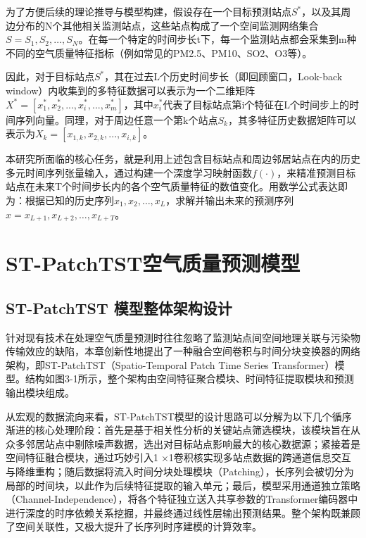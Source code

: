 为了方便后续的理论推导与模型构建，假设存在一个目标预测站点$S^*$，以及其周边分布的N个其他相关监测站点，这些站点构成了一个空间监测网络集合$S={S_1,S_2,\dots,S_N}$。在每一个特定的时间步长t下，每一个监测站点都会采集到m种不同的空气质量特征指标（例如常见的PM2.5、PM10、SO2、O3等）。

因此，对于目标站点$S^*$，其在过去L个历史时间步长（即回顾窗口，Look-back window）内收集到的多特征数据可以表示为一个二维矩阵$X^* = [x_1^*, x_2^*, ..., x_i^*, ..., x_m^*]$，其中$x_i^*$代表了目标站点第i个特征在L个时间步上的时间序列向量。同理，对于周边任意一个第k个站点$S_k$，其多特征历史数据矩阵可以表示为$X_k = [x_{1,k}, x_{2,k}, ..., x_{i,k}]$。

本研究所面临的核心任务，就是利用上述包含目标站点和周边邻居站点在内的历史多元时间序列张量输入，通过构建一个深度学习映射函数$f(⋅)$，来精准预测目标站点在未来T个时间步长内的各个空气质量特征的数值变化。用数学公式表达即为：根据已知的历史序列$x_1,x_2,…,x_L$，求解并输出未来的预测序列$x=x_{L+1},x_{L+2},…,x_{L+T}$。

\section{ST-PatchTST空气质量预测模型}

\subsection{ST-PatchTST 模型整体架构设计}


针对现有技术在处理空气质量预测时往往忽略了监测站点间空间地理关联与污染物传输效应的缺陷，本章创新性地提出了一种融合空间卷积与时间分块变换器的网络架构，即ST-PatchTST（Spatio-Temporal Patch Time Series Transformer）模型。结构如图3-1所示，整个架构由空间特征聚合模块、时间特征提取模块和预测输出模块组成。



从宏观的数据流向来看，ST-PatchTST模型的设计思路可以分解为以下几个循序渐进的核心处理阶段：首先是基于相关性分析的关键站点筛选模块，该模块旨在从众多邻居站点中剔除噪声数据，选出对目标站点影响最大的核心数据源；紧接着是空间特征融合模块，通过巧妙引入1 ×1卷积核实现多站点数据的跨通道信息交互与降维重构；随后数据将流入时间分块处理模块（Patching），长序列会被切分为局部的时间块，以此作为后续特征提取的输入单元；最后，模型采用通道独立策略（Channel-Independence），将各个特征独立送入共享参数的Transformer编码器中进行深度的时序依赖关系挖掘，并最终通过线性层输出预测结果。整个架构既兼顾了空间关联性，又极大提升了长序列时序建模的计算效率。

